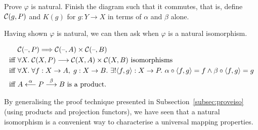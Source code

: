 \begin{exercise}


Prove $\varphi$ is natural. Finish the diagram such that it commutes, that is,
define $\mathcal{C} (g,P)$ and $K(g)$ for $g : Y \to X$ in terms of $\alpha$ and
$\beta$ alone.
\end{exercise}

Having shown $\varphi$ is natural, we can then ask when $\varphi$ is a natural
isomorphism.


\begin{align*}
    & \lscat C (\phold, P) \natarrow \lscat C (\phold, A) \times \lscat C (\phold, B)\\
    \textrm{iff  } & \forall X.\;\lscat C (X, P) \morpharrow \lscat C (X, A) \times \lscat C (X, B)
                        \textrm{ isomorphisms}\\
    \textrm{iff  } & \forall X.\;\forall f: X \to A,\;g : X \to B.\ 
                        \exists! \langle f, g \rangle : X \to P.\ 
                        \alpha \comp \langle f, g \rangle = f \wedge
                        \beta \comp \langle f, g \rangle = g \\
    \textrm{iff  } & A \overset{\alpha}{\longleftarrow} P \morpharr{\beta} B \textrm{ is a product.}
\end{align*}

By generalising the proof technique presented in
Subsection~\ref{subsec:proveiso} (using products and projection functors), we
have seen that a natural isomorphism is a convenient way to characterise a
universal mapping properties.
